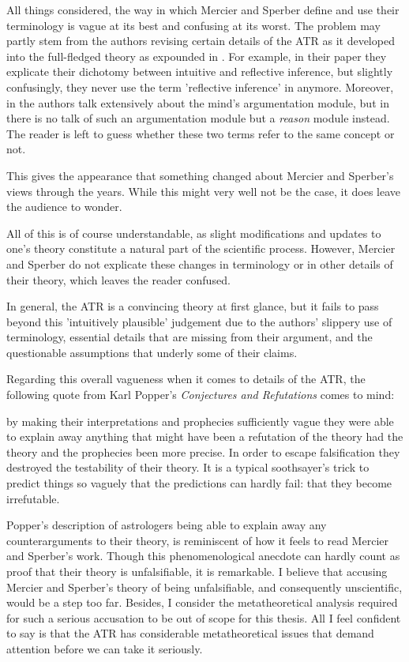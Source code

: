 All things considered, the way in which Mercier and Sperber define and use their terminology is vague at its best and confusing at its worst. The problem may partly stem from the authors revising certain details of the ATR as it developed into the full-fledged theory as expounded in \citet{MS17}.
For example, in their \citeyear{MS09} paper they explicate their dichotomy between intuitive and reflective inference, but slightly confusingly, they never use the term 'reflective inference' in \citet{MS11} anymore.
Moreover, in \citet{MS09} the authors talk extensively about the mind's argumentation module, but in \citet{MS17} there is no talk of such an argumentation module but a \emph{reason} module instead. The reader is left to guess whether these two terms refer to the same concept or not.

This gives the appearance that something changed about Mercier and Sperber's views through the years.
While this might very well not be the case, it does leave the audience to wonder.

All of this is of course understandable, as slight modifications and updates to one's theory constitute a natural part of the scientific process. However, Mercier and Sperber do not explicate these changes in terminology or in other details of their theory, which leaves the reader confused.

In general, the ATR is a convincing theory at first glance, but it fails to pass beyond this 'intuitively plausible' judgement due to the authors' slippery use of terminology, essential details that are missing from their argument, and the questionable assumptions that underly some of their claims.

Regarding this overall vagueness when it comes to details of the ATR, the following quote from Karl Popper's \emph{Conjectures and Refutations} comes to mind:
\begin{quoting}
    by making their interpretations and prophecies sufficiently vague they were able to explain away anything that might have been a refutation of the theory had the theory and the prophecies been more precise. In order to escape falsification they destroyed the testability of their theory. It is a typical soothsayer's trick to predict things so vaguely that the predictions can hardly fail: that they become irrefutable.
    \hfill \citep[p.~37]{Popper62}
\end{quoting}
Popper's description of astrologers being able to explain away any counterarguments to their theory, is reminiscent of how it feels to read Mercier and Sperber's work. Though this phenomenological anecdote can hardly count as proof that their theory is unfalsifiable, it is remarkable.
I believe that accusing Mercier and Sperber's theory of being unfalsifiable, and consequently unscientific, would be a step too far. Besides, I consider the metatheoretical analysis required for such a serious accusation to be out of scope for this thesis. All I feel confident to say is that the ATR has considerable metatheoretical issues that demand attention before we can take it seriously.

